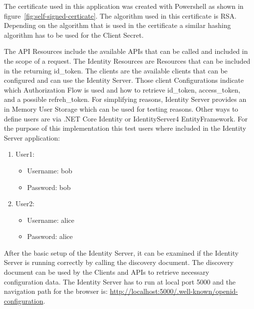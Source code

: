 The certificate used in this application was created with Powershell as shown in figure~\ref{fig:self-signed-certicate}. The algorithm used in this certificate is RSA. Depending on the algorithm that is used in the certificate a similar hashing algorithm has to be used for the Client Secret.


The API Resources include the available APIs that can be called and included in the scope of a request. The Identity Resources are Resources that can be included in the returning id\_token. The clients are the available clients that can be configured and can use the Identity Server. Those client Configurations indicate which Authorization Flow is used and how to retrieve id\_token, access\_token, and a possible refreh\_token. For simplifying reasons, Identity Server provides an in Memory User Storage which can be used for testing reasons. Other ways to define users are via .NET Core Identity or IdentityServer4 EntityFramework. For the purpose of this implementation this test users where included in the Identity Server application:
\begin{enumerate}
	\item User1:
	\begin{itemize}
		\item  Username: bob
		\item  Password: bob
	\end{itemize} 
	\item User2:
	\begin{itemize}
		\item  Username: alice
		\item  Password: alice
	\end{itemize} 
\end{enumerate}

After the basic setup of the Identity Server, it can be examined if the Identity Server is running correctly by calling the discovery document. The discovery document can be used by the Clients and APIs to retrieve necessary configuration data. The Identity Server has to run at local port 5000 and the navigation path for the browser is:
\url{http://localhost:5000/.well-known/openid-configuration}.

